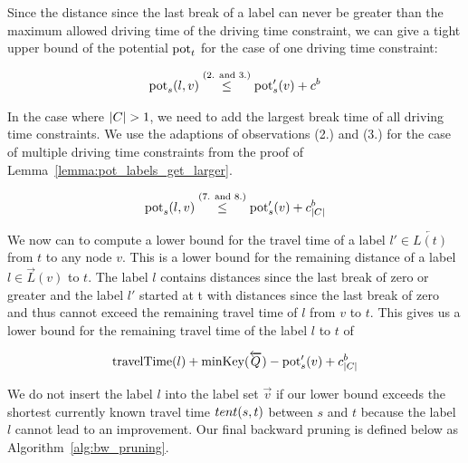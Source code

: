 Since the distance since the last break of a label can never be greater than the maximum allowed driving time of the driving time constraint, we can give a tight upper bound of the potential $\operatorname{pot}_t$ for the case of one driving time constraint:

\begin{align}
	\operatorname{pot}_s(l,v) \overset{\text{(2. and 3.)}}{\le} \operatorname{pot}'_s(v) + c^b
\end{align}

In the case where $|C| > 1$, we need to add the largest break time of all driving time constraints. We use the adaptions of observations (2.) and (3.) for the case of multiple driving time constraints from the proof of Lemma~\ref{lemma:pot_labels_get_larger}.

\begin{align}
	\operatorname{pot}_s(l,v) \overset{\text{(7. and 8.)}}{\le} \operatorname{pot}'_s(v) + c_{|C|}^b
\end{align}

We now can to compute a lower bound for the travel time of a label $l' \in \overleftarrow{L(t)}$ from $t$ to any node $v$. This is a lower bound for the remaining distance of a label $l \in \overrightarrow{L}(v)$ to $t$. The label $l$ contains distances since the last break of zero or greater and the label $l'$ started at t with distances since the last break of zero and thus cannot exceed the remaining travel time of $l$ from $v$ to $t$. This gives us a lower bound for the remaining travel time of the label $l$ to $t$ of

\begin{align}
	\operatorname{travelTime}(l) + \operatorname{minKey}(\overleftarrow{Q}) - \operatorname{pot}'_s(v) + c_{|C|}^b
\end{align}

We do not insert the label $l$ into the label set $\overrightarrow{v}$ if our lower bound exceeds the shortest currently known travel time $tent(s,t)$ between $s$ and $t$ because the label $l$ cannot lead to an improvement. Our final backward pruning is defined below as Algorithm~\ref{alg:bw_pruning}.

